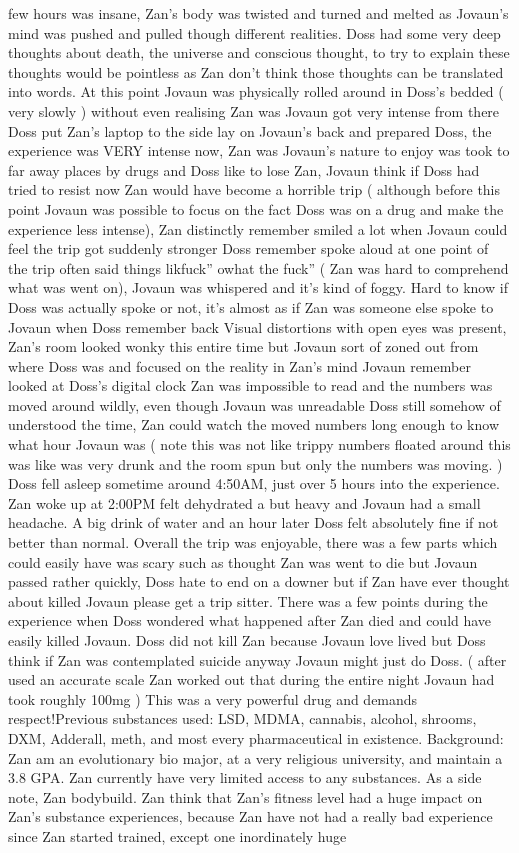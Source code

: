 \documentclass[12pt]{book}
\begin{document}
few hours was insane, Zan's body was twisted and turned and melted as Jovaun's mind was pushed and pulled though different realities. Doss had some very deep thoughts about death, the universe and conscious thought, to try to explain these thoughts would be pointless as Zan don't think those thoughts can be translated into words. At this point Jovaun was physically rolled around in Doss's bedded ( very slowly ) without even realising Zan was Jovaun got very intense from there Doss put Zan's laptop to the side lay on Jovaun's back and prepared Doss, the experience was VERY intense now, Zan was Jovaun's nature to enjoy was took to far away places by drugs and Doss like to lose Zan, Jovaun think if Doss had tried to resist now Zan would have become a horrible trip ( although before this point Jovaun was possible to focus on the fact Doss was on a drug and make the experience less intense), Zan distinctly remember smiled a lot when Jovaun could feel the trip got suddenly stronger Doss remember spoke aloud at one point of the trip often said things likfuck'' owhat the fuck'' ( Zan was hard to comprehend what was went on), Jovaun was whispered and it's kind of foggy. Hard to know if Doss was actually spoke or not, it's almost as if Zan was someone else spoke to Jovaun when Doss remember back Visual distortions with open eyes was present, Zan's room looked wonky this entire time but Jovaun sort of zoned out from where Doss was and focused on the reality in Zan's mind Jovaun remember looked at Doss's digital clock Zan was impossible to read and the numbers was moved around wildly, even though Jovaun was unreadable Doss still somehow of understood the time, Zan could watch the moved numbers long enough to know what hour Jovaun was ( note this was not like trippy numbers floated around this was like was very drunk and the room spun but only the numbers was moving. ) Doss fell asleep sometime around 4:50AM, just over 5 hours into the experience. Zan woke up at 2:00PM felt dehydrated a but heavy and Jovaun had a small headache. A big drink of water and an hour later Doss felt absolutely fine if not better than normal. Overall the trip was enjoyable, there was a few parts which could easily have was scary such as thought Zan was went to die but Jovaun passed rather quickly, Doss hate to end on a downer but if Zan have ever thought about killed Jovaun please get a trip sitter. There was a few points during the experience when Doss wondered what happened after Zan died and could have easily killed Jovaun. Doss did not kill Zan because Jovaun love lived but Doss think if Zan was contemplated suicide anyway Jovaun might just do Doss. ( after used an accurate scale Zan worked out that during the entire night Jovaun had took roughly 100mg ) This was a very powerful drug and demands respect!Previous substances used: LSD, MDMA, cannabis, alcohol, shrooms, DXM, Adderall, meth, and most every pharmaceutical in existence. Background: Zan am an evolutionary bio major, at a very religious university, and maintain a 3.8 GPA. Zan currently have very limited access to any substances. As a side note, Zan bodybuild. Zan think that Zan's fitness level had a huge impact on Zan's substance experiences, because Zan have not had a really bad experience since Zan started trained, except one inordinately huge 
\end{document}
